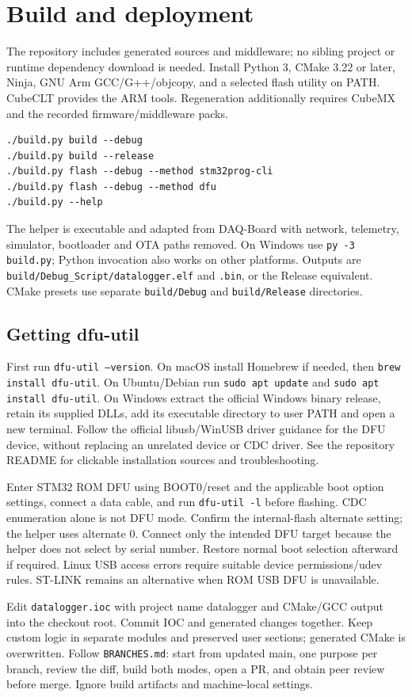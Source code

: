 \section{Build and deployment}
The repository includes generated sources and middleware; no sibling project or runtime dependency download is needed. Install Python 3, CMake 3.22 or later, Ninja, GNU Arm GCC/G++/objcopy, and a selected flash utility on PATH. CubeCLT provides the ARM tools. Regeneration additionally requires CubeMX and the recorded firmware/middleware packs.
\begin{verbatim}
./build.py build --debug
./build.py build --release
./build.py flash --debug --method stm32prog-cli
./build.py flash --debug --method dfu
./build.py --help
\end{verbatim}
The helper is executable and adapted from DAQ-Board with network, telemetry, simulator, bootloader and OTA paths removed. On Windows use \texttt{py -3 build.py}; Python invocation also works on other platforms. Outputs are \texttt{build/Debug\_Script/datalogger.elf} and \texttt{.bin}, or the Release equivalent. CMake presets use separate \texttt{build/Debug} and \texttt{build/Release} directories.

\subsection{Getting dfu-util}
First run \texttt{dfu-util --version}. On macOS install Homebrew if needed, then \texttt{brew install dfu-util}. On Ubuntu/Debian run \texttt{sudo apt update} and \texttt{sudo apt install dfu-util}. On Windows extract the official Windows binary release, retain its supplied DLLs, add its executable directory to user PATH and open a new terminal. Follow the official libusb/WinUSB driver guidance for the DFU device, without replacing an unrelated device or CDC driver. See the repository README for clickable installation sources and troubleshooting.

Enter STM32 ROM DFU using BOOT0/reset and the applicable boot option settings, connect a data cable, and run \texttt{dfu-util -l} before flashing. CDC enumeration alone is not DFU mode. Confirm the internal-flash alternate setting; the helper uses alternate 0. Connect only the intended DFU target because the helper does not select by serial number. Restore normal boot selection afterward if required. Linux USB access errors require suitable device permissions/udev rules. ST-LINK remains an alternative when ROM USB DFU is unavailable.

Edit \texttt{datalogger.ioc} with project name datalogger and CMake/GCC output into the checkout root. Commit IOC and generated changes together. Keep custom logic in separate modules and preserved user sections; generated CMake is overwritten. Follow \texttt{BRANCHES.md}: start from updated main, one purpose per branch, review the diff, build both modes, open a PR, and obtain peer review before merge. Ignore build artifacts and machine-local settings.
